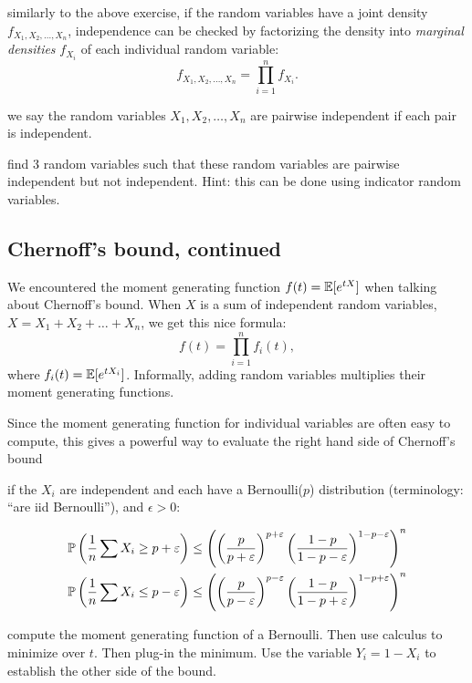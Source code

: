 \documentclass{article}
\begin{document}
 similarly to the above exercise, if the random variables have a joint density $f_{X_1, X_2, \dots, X_n}$, independence can be checked by factorizing the density into \emph{marginal densities} $f_{X_i}$ of each individual random variable:
\[ f_{X_1, X_2, \dots, X_n} = \prod_{i=1}^n f_{X_i}. \]

 we say the random variables $X_1, X_2, \dots, X_n$ are pairwise independent if each pair is independent.

 find 3 random variables such that these random variables are pairwise independent but not independent. Hint: this can be done using indicator random variables.


\subsection{Chernoff's bound, continued}\label{sec:chernoff-revisited}

We encountered the moment generating function $f(t) = \E[e^{tX}]$ when talking about Chernoff's bound. When $X$ is a sum of independent random variables, $X = X_1 + X_2 + \dots + X_n$, we get this nice formula:
\[ f(t) = \prod_{i=1}^n f_i(t), \]
where $f_i(t) = \E[e^{tX_i}]$. Informally, adding random variables multiplies their moment generating functions.

Since the moment generating function for individual variables are often easy to compute, this gives a powerful way to evaluate the right hand side of Chernoff's bound 

 if the $X_i$ are independent and each have a Bernoulli($p$) distribution (terminology: ``are iid Bernoulli''), and $\epsilon > 0$:

\begin{align*}
	\P \left (\frac{1}{n} \sum X_i \geq p + \varepsilon \right ) &\leq \left (\left (\frac{p}{p + \varepsilon}\right )^{p+\varepsilon} {\left (\frac{1 - p}{1-p- \varepsilon}\right )}^{1 - p- \varepsilon}\right )^n  \\
	\P \left (\frac{1}{n} \sum X_i \leq p - \varepsilon \right ) &\leq \left (\left (\frac{p}{p - \varepsilon}\right )^{p-\varepsilon} {\left (\frac{1 - p}{1-p+ \varepsilon}\right )}^{1 - p+ \varepsilon}\right )^n 
\end{align*}

 compute the moment generating function of a Bernoulli. Then use calculus to minimize over $t$. Then plug-in the minimum. Use the variable $Y_i = 1 - X_i$ to establish the other side of the bound.
\end{document}
